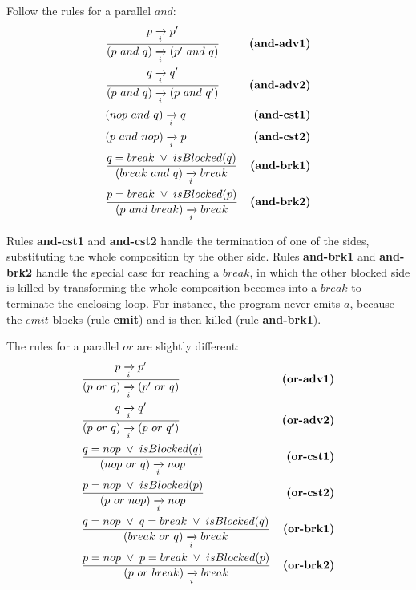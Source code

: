 Follow the rules for a parallel $and$:
%
\begin{eqnarray*}
& \frac
    { p \ST p' }
    { (p~and~q) \ST (p'~and~q) }
    & \textbf{(and-adv1)}      \\
& \frac
    { q \ST q' }
    { (p~and~q) \ST (p~and~q') }
    & \textbf{(and-adv2)}      \\
& (nop~and~q) \ST q
    & \textbf{(and-cst1)}   \\
& (p~and~nop) \ST p
    & \textbf{(and-cst2)}   \\
& \frac
    { q=break \1\vee\1 isBlocked(q) }
    { (break~and~q) \ST break }
    & \textbf{(and-brk1)}   \\
& \frac
    { p=break \1\vee\1 isBlocked(p) }
    { (p~and~break) \ST break }
    & \textbf{(and-brk2)}   %
\end{eqnarray*}

Rules \textbf{and-cst1} and \textbf{and-cst2} handle the termination of one of 
the sides, substituting the whole composition by the other side.
Rules \textbf{and-brk1} and \textbf{and-brk2} handle the special case for 
reaching a $break$, in which the other blocked side is killed by transforming 
the whole composition becomes into a $break$ to terminate the enclosing loop.
For instance, the program  never emits $a$, 
because the $emit$ blocks (rule \textbf{emit}) and is then killed (rule 
\textbf{and-brk1}).

The rules for a parallel $or$ are slightly different:
%
\begin{eqnarray*}
& \frac
    { p \ST p' }
    { (p~or~q) \ST (p'~or~q) }
    & \textbf{(or-adv1)}   \\
& \frac
    { q \ST q' }
    { (p~or~q) \ST (p~or~q') }
    & \textbf{(or-adv2)}   \\
& \frac
    { q=nop \1\vee\1 isBlocked(q) }
    { (nop~or~q) \ST nop }
    & \textbf{(or-cst1)}   \\
& \frac
    { p=nop \1\vee\1 isBlocked(p) }
    { (p~or~nop) \ST nop }
    & \textbf{(or-cst2)}   \\
& \frac
    { q=nop \1\vee\1 q=break \1\vee\1 isBlocked(q) }
    { (break~or~q) \ST break }
    & \textbf{(or-brk1)}   \\
& \frac
    { p=nop \1\vee\1 p=break \1\vee\1 isBlocked(p) }
    { (p~or~break) \ST break }
    & \textbf{(or-brk2)}   %
\end{eqnarray*}

